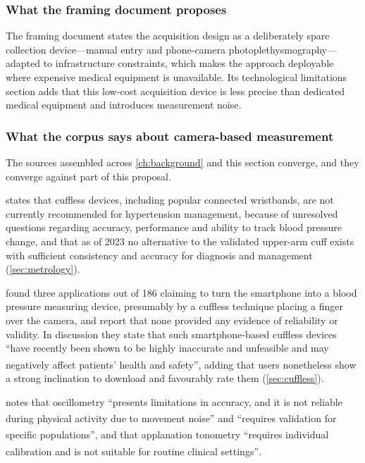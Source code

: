 \documentclass[12pt,a4paper,oneside]{report}
\newcommand{\bq}[1]{``#1''\textsuperscript{\dag}}
\begin{document}
\subsubsection{What the framing document proposes}

The framing document states the acquisition design as a deliberately spare collection device---manual entry and phone-camera photoplethysmography---adapted to infrastructure constraints, which makes the approach deployable where expensive medical equipment is unavailable. Its technological limitations section adds that this low-cost acquisition device is less precise than dedicated medical equipment and introduces measurement noise.

\subsubsection{What the corpus says about camera-based measurement}

The sources assembled across \cref{ch:background} and this section converge, and they converge against part of this proposal.

\Textcite{who2023hypertension} states that cuffless devices, including popular connected wristbands, are not currently recommended for hypertension management, because of unresolved questions regarding accuracy, performance and ability to track blood pressure change, and that as of 2023 no alternative to the validated upper-arm cuff exists with sufficient consistency and accuracy for diagnosis and management (\cref{sec:metrology}).

\Textcite{alessa2019} found three applications out of 186 claiming to turn the smartphone into a blood pressure measuring device, presumably by a cuffless technique placing a finger over the camera, and report that none provided any evidence of reliability or validity. In discussion they state that such smartphone-based cuffless devices \bq{have recently been shown to be highly inaccurate and unfeasible and may negatively affect patients' health and safety}, adding that users nonetheless show a strong inclination to download and favourably rate them (\cref{sec:cuffless}).

\Textcite{navarro2023} notes that oscillometry \bq{presents limitations in accuracy, and it is not reliable during physical activity due to movement noise} and \bq{requires validation for specific populations}, and that applanation tonometry \bq{requires individual calibration and is not suitable for routine clinical settings}.
\end{document}
